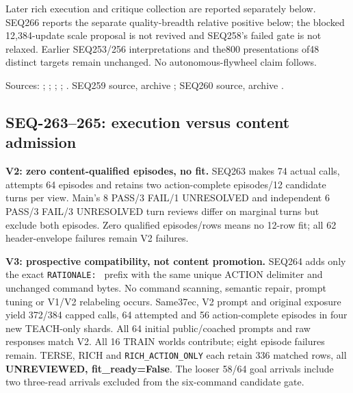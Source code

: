 \documentclass{article}
\begin{document}
Later rich execution and critique collection are reported separately below.
SEQ266 reports the separate quality-breadth relative positive below; the blocked 12,384-update
scale proposal is not revived and SEQ258's failed gate is not relaxed.
Earlier SEQ253/256 interpretations and the800 presentations of48 distinct targets
remain unchanged. No autonomous-flywheel claim follows.

Sources: ;
;
;
;
.
SEQ259 source, archive
;
SEQ260 source, archive
.

\subsection{SEQ-263--265: execution versus content admission}
\label{sec:rich-execution-content}

\textbf{V2: zero content-qualified episodes, no fit.} SEQ263 makes 74 actual calls,
attempts 64 episodes and retains two action-complete episodes/12 candidate
turns per view. Main's 8 PASS/3 FAIL/1 UNRESOLVED and independent
6 PASS/3 FAIL/3 UNRESOLVED turn reviews differ on marginal turns but exclude
both episodes. Zero qualified episodes/rows means no 12-row fit; all 62
header-envelope failures remain V2 failures.

\textbf{V3: prospective compatibility, not content promotion.} SEQ264 adds only the
exact \texttt{RATIONALE: } prefix with the same unique ACTION delimiter and unchanged
command bytes. No command scanning, semantic repair, prompt tuning or V1/V2
relabeling occurs. Same37ec, V2 prompt and original exposure yield 372/384
capped calls, 64 attempted and 56 action-complete episodes in four new TEACH-only
shards. All 64 initial public/coached prompts and raw responses match V2.
All 16 TRAIN worlds contribute; eight episode failures remain. TERSE, RICH
and \texttt{RICH\_ACTION\_ONLY} each retain 336 matched rows, all \textbf{UNREVIEWED,
fit\_ready=False}. The looser 58/64 goal arrivals include two three-read
arrivals excluded from the six-command candidate gate.
\end{document}
